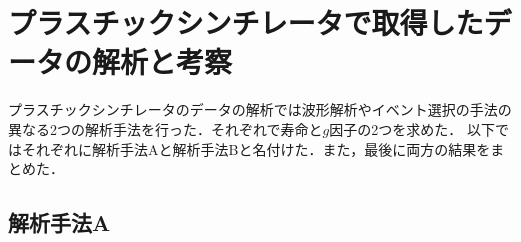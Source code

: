 







%


 \section{プラスチックシンチレータで取得したデータの解析と考察}
 プラスチックシンチレータのデータの解析では波形解析やイベント選択の手法の異なる2つの解析手法を行った．それぞれで寿命と$g$因子の2つを求めた．
 以下ではそれぞれに解析手法Aと解析手法Bと名付けた．また，最後に両方の結果をまとめた．
 
  \subsection{解析手法A}
